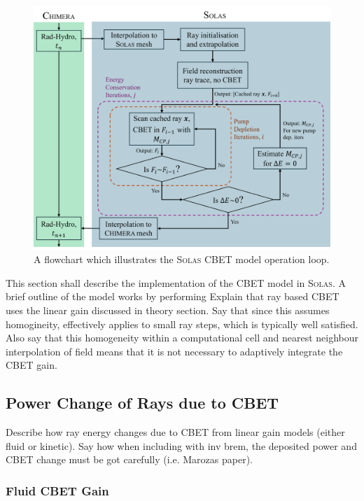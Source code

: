 \begin{figure}[t!]
    \includegraphics[width=0.9\linewidth]{Numerics/Images/CBET_flowchart.PNG}
    \centering
    \caption{A flowchart which illustrates the \textsc{Solas} \ac{CBET} model operation loop.}%
    \label{fig:SOLAS_CBET_flowchart}
\end{figure}

This section shall describe the implementation of the \ac{CBET} model in \textsc{Solas}.
A brief outline of the  model works by performing
Explain that ray based \ac{CBET} uses the linear gain discussed in theory section.
Say that since this assumes homogineity, effectively applies to small ray steps, which is typically well satisfied.
Also say that this homogeneity within a computational cell and nearest neighbour interpolation of field means that it is not necessary to adaptively integrate the CBET gain.

\subsection{Power Change of Rays due to CBET}

Describe how ray energy changes due to CBET from linear gain models (either fluid or kinetic).
Say how when including with inv brem, the deposited power and CBET change must be got carefully (i.e. Marozas paper).

\subsubsection{Fluid CBET Gain}

